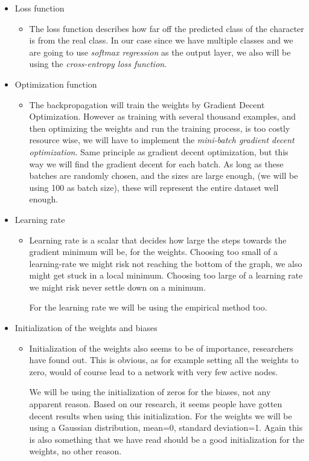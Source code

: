 \documentclass[Report.tex]{subfiles}
\begin{document}
\begin{flushleft}
\begin{itemize}
\begin{itemize}
     \end{itemize}
     \item{Loss function}
     \begin{itemize}
      \item{The loss function describes how far off the predicted class of the character is from the real class. In our case since we have multiple classes and we are going to use \textit{softmax regression} as the output layer, we also will be using the \textit{cross-entropy loss function}.}
     \end{itemize}
     \item{Optimization function}
     \begin{itemize}
      \item{The backpropagation will train the weights by Gradient Decent Optimization. However as training with several thousand examples, and then optimizing the weights and run the training process, is too costly resource wise, we will have to implement the \textit{mini-batch gradient decent optimization}. Same principle as gradient decent optimization, but this way we will find the gradient decent for each batch. As long as these batches are randomly chosen, and the sizes are large enough, (we will be using 100 as batch size), these will represent the entire dataset well enough.}
     \end{itemize}
     \item{Learning rate}
     \begin{itemize}
      \item{Learning rate is a scalar that decides how large the steps towards the gradient minimum will be, for the weights. Choosing too small of a learning-rate we might risk not reaching the bottom of the graph, we also might get stuck in a local minimum. Choosing too large of a learning rate we might risk never settle down on a minimum. \par
      For the learning rate we will be using the empirical method too.}
     \end{itemize}
     \item{Initialization of the weights and biases}
     \begin{itemize}
      \item{Initialization of the weights also seems to be of importance, researchers have found out. This is obvious, as for example setting all the weights to zero, would of course lead to a network with very few active nodes. \par
      We will be using the initialization of zeros for the biases, not any apparent reason. Based on our research, it seems people have gotten decent results when using this initialization. For the weights we will be using a Gaussian distribution, mean=0, standard deviation=1. Again this is also something that we have read should be a good initialization for the weights, no other reason.}

\end{itemize}
\end{itemize}
\end{flushleft}
\end{document}

